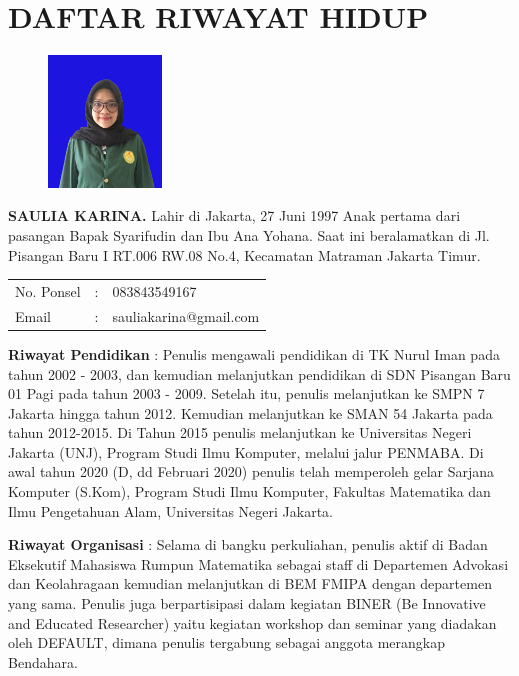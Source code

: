 \pagestyle{empty}
\chapter*{\centering \large DAFTAR RIWAYAT HIDUP}
\thispagestyle{empty}

\begin{figure}
	\vspace{-25pt}
	\begin{center}
		\includegraphics[width=0.27\textwidth]{gambar/pas-foto2}
	\end{center}
	\vspace{-80pt}
\end{figure}

\noindent \textbf{SAULIA KARINA.}  Lahir di Jakarta, 27 Juni 1997  Anak pertama dari pasangan Bapak Syarifudin dan Ibu Ana Yohana. Saat ini beralamatkan di Jl. Pisangan Baru I RT.006 RW.08 No.4, Kecamatan Matraman Jakarta Timur.

\vspace{0.5cm}
\noindent
\begin{center}
	\begin{flushright}
		\begin{tabular}{lcl}
			No. Ponsel	& :&  083843549167 \\
			Email	& :&  sauliakarina@gmail.com
		\end{tabular}
	\end{flushright}
\end{center}
\vspace{0.5cm}

\noindent \textbf{Riwayat Pendidikan} : Penulis mengawali pendidikan di TK Nurul Iman pada tahun 2002 - 2003, dan kemudian melanjutkan pendidikan di SDN Pisangan Baru 01 Pagi pada tahun 2003 - 2009. Setelah itu, penulis melanjutkan ke SMPN 7 Jakarta hingga tahun 2012. Kemudian melanjutkan ke SMAN 54 Jakarta pada tahun 2012-2015. Di Tahun 2015 penulis melanjutkan ke Universitas Negeri Jakarta (UNJ), Program Studi Ilmu Komputer, melalui jalur PENMABA. Di awal tahun 2020 (D, dd Februari 2020) penulis telah memperoleh gelar Sarjana Komputer (S.Kom), Program Studi Ilmu Komputer, Fakultas Matematika dan Ilmu Pengetahuan Alam, Universitas Negeri Jakarta.

\noindent \textbf{Riwayat Organisasi} : Selama di bangku perkuliahan, penulis aktif di Badan Eksekutif Mahasiswa Rumpun Matematika sebagai staff di Departemen Advokasi dan Keolahragaan kemudian melanjutkan di BEM FMIPA dengan departemen yang sama. Penulis juga berpartisipasi dalam kegiatan BINER (Be Innovative and Educated Researcher) yaitu kegiatan workshop dan seminar yang diadakan oleh DEFAULT, dimana penulis tergabung sebagai anggota merangkap Bendahara. 